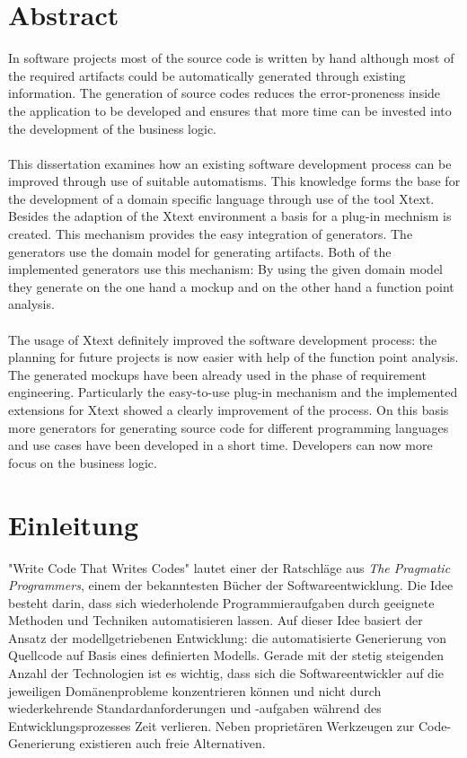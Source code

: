 \documentclass[a4paper,12pt]{scrreprt}
\begin{document}
\chapter*{Abstract}
In software projects most of the source code is written by hand although most of the required artifacts could be automatically generated through existing information. The generation of source codes reduces the error-proneness inside the application to be developed and ensures that more time can be invested into the development of the business logic.
\\
\\
This dissertation examines how an existing software development process can be improved through use of suitable automatisms. This knowledge forms the base for the development of a domain specific language through use of the tool Xtext. Besides the adaption of the Xtext environment a basis for a plug-in mechnism is created. This mechanism provides the easy integration of generators. The generators use the domain model for generating artifacts. Both of the implemented generators use this mechanism: By using the given domain model they generate on the one hand a mockup and on the other hand a function point analysis.
\\
\\
The usage of Xtext definitely improved the software development process: the planning for future projects is now easier with help of the function point analysis. The generated mockups have been already used in the phase of requirement engineering. Particularly the easy-to-use plug-in mechanism and the implemented extensions for Xtext showed a clearly improvement of the process. On this basis more generators for generating source code for different programming languages and use cases have been developed in a short time. Developers can now more focus on the business logic.
\chapter{Einleitung}
"Write Code That Writes Codes" \cite{ht2006}
lautet einer der Ratschläge aus \textit{The Pragmatic Programmers}, einem der bekanntesten Bücher der Softwareentwicklung. Die Idee besteht darin, dass sich wiederholende Programmieraufgaben durch geeignete Methoden und Techniken automatisieren lassen. Auf dieser Idee basiert der Ansatz der modellgetriebenen Entwicklung: die automatisierte Generierung von Quellcode auf Basis eines definierten Modells. Gerade mit der stetig steigenden Anzahl der Technologien ist es wichtig, dass sich die Softwareentwickler auf die jeweiligen Domänenprobleme konzentrieren können und nicht durch wiederkehrende Standardanforderungen und -aufgaben während des Entwicklungsprozesses Zeit verlieren.
Neben proprietären Werkzeugen zur Code-Generierung existieren auch freie Alternativen.
\end{document}
